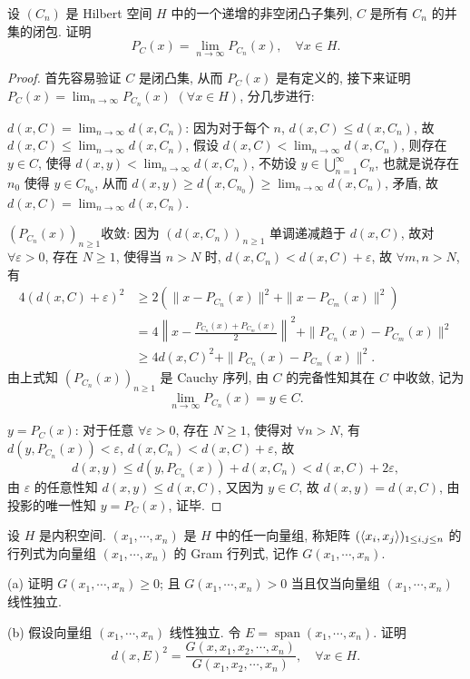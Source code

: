 \begin{exercise}
    设 $\left(C_{n}\right)$ 是 Hilbert 空间 $H$ 中的一个递增的非空闭凸子集列, $C$ 是所有 $C_n$ 的并集的闭包. 证明
    \[
    P_{C}(x)=\lim_{n\to\infty} P_{C_n}(x), \quad \forall x \in H.
    \]
\end{exercise}

\begin{proof}
    首先容易验证 $C$ 是闭凸集, 从而 $P_C(x)$ 是有定义的, 
    接下来证明 $P_C(x)=\lim_{n\to\infty}P_{C_n}(x)$ $(\forall x\in H)$, 分几步进行:

    $d(x,C)=\lim_{n\to\infty}d(x,C_n)$:
    因为对于每个 $n$, $d(x,C)\leq d(x,C_n)$,
    故 $d(x,C)\leq \lim_{n\to\infty}d(x,C_n)$,
    假设 $d(x,C)<\lim_{n\to\infty}d(x,C_n)$,
    则存在 $y\in C$, 使得 $d(x,y)<\lim_{n\to\infty}d(x,C_n)$,
    不妨设 $y\in\bigcup_{n=1}^{\infty}C_n$, 也就是说存在 $n_0$ 使得 $y\in C_{n_0}$,
    从而 $d(x,y)\geq d(x,C_{n_0})\geq\lim_{n\to\infty}d(x,C_n)$, 矛盾, 故 $d(x,C)=\lim_{n\to\infty}d(x,C_n)$.
    
    $(P_{C_n}(x))_{n\geq 1}$收敛:
    因为 $(d(x,C_n))_{n\geq 1}$ 单调递减趋于 $d(x,C)$,
    故对 $\forall\varepsilon>0$, 存在 $N\geq 1$,
    使得当 $n>N$ 时, $d(x,C_n)<d(x,C)+\varepsilon$,
    故 $\forall m,n>N$, 有
    \begin{align*}
        4(d(x,C)+\varepsilon)^2
        &\geq 2(\|x-P_{C_n}(x)\|^2+\|x-P_{C_m}(x)\|^2) \\
        &=4\left\|x-\frac{P_{C_n}(x)+P_{C_m}(x)}{2}\right\|^2+\|P_{C_n}(x)-P_{C_m}(x)\|^2 \\
        &\geq 4d(x,C)^2+\|P_{C_n}(x)-P_{C_m}(x)\|^2.
    \end{align*}
    由上式知 $(P_{C_n}(x))_{n\geq 1}$ 是 Cauchy 序列, 
    由 $C$ 的完备性知其在 $C$ 中收敛, 记为
    \[\lim_{n\to\infty}P_{C_n}(x)=y\in C.\]
    
    $y=P_C(x)$: 
    对于任意 $\forall\varepsilon>0$,
    存在 $N\geq 1$, 使得对 $\forall n>N$,
    有 $d(y,P_{C_n}(x))<\varepsilon$, $d(x,C_n)<d(x,C)+\varepsilon$, 故
    \[d(x,y)\leq d(y,P_{C_n}(x))+d(x,C_n)<d(x,C)+2\varepsilon,\] 
    由 $\varepsilon$ 的任意性知 $d(x,y)\leq d(x,C)$, 又因为 $y\in C$, 
    故 $d(x,y)=d(x,C)$, 由投影的唯一性知 $y=P_C(x)$, 证毕.
\end{proof}




\begin{exercise}
    设 $H$ 是内积空间. $(x_{1}, \cdots, x_{n})$ 是 $H$ 中的任一向量组,
    称矩阵 $(\langle x_i,x_j\rangle)_{1\leq i,j\leq n}$ 
    的行列式为向量组 $\left(x_{1},\cdots, x_{n}\right)$ 的 Gram 行列式, 记作 $G(x_{1},\cdots,x_{n})$.
    
    (a) 证明 $G(x_{1},\cdots,x_{n})\geq 0$; 
    且 $G\left(x_{1},\cdots,x_{n}\right)>0$ 当且仅当向量组 $\left(x_{1}, \cdots, x_{n}\right)$ 线性独立.
    
    (b) 假设向量组 $\left(x_{1},\cdots,x_{n}\right)$ 线性独立. 
    令 $E=\operatorname{span}\left(x_{1},\cdots, x_{n}\right)$. 证明
    \[
        d(x, E)^{2}=\frac{G\left(x, x_{1}, x_{2}, \cdots, x_{n}\right)}{G\left(x_{1}, x_{2}, \cdots, x_{n}\right)}, \quad \forall x\in H.
    \]
\end{exercise}

